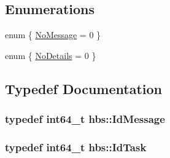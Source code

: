 \subsection*{Enumerations}
\begin{DoxyCompactItemize}
\item 
enum \{ \hyperlink{namespacehbs_a9b3fe1d385d686f6fb991d399be53626aa48126b79fe9a207a4e5274237d52dfb}{No\-Message} = 0
 \}
\item 
enum \{ \hyperlink{namespacehbs_ad95bc3c367f3d09c0d70ff80c469a15ca18ab2d1bfa3ea7aaf3a8a3272c384667}{No\-Details} = 0
 \}
\end{DoxyCompactItemize}


\subsection{Typedef Documentation}
\hypertarget{namespacehbs_a6d744a52db9bca0a9752a009118641f4}{
\subsubsection[{Id\-Message}]{\setlength{\rightskip}{0pt plus 5cm}typedef int64\-\_\-t {\bf hbs\-::\-Id\-Message}}}\label{namespacehbs_a6d744a52db9bca0a9752a009118641f4}
\hypertarget{namespacehbs_aab8d06205ac2b0b14186327fd6c1c0d6}{
\subsubsection[{Id\-Task}]{\setlength{\rightskip}{0pt plus 5cm}typedef int64\-\_\-t {\bf hbs\-::\-Id\-Task}}}\label{namespacehbs_aab8d06205ac2b0b14186327fd6c1c0d6}


